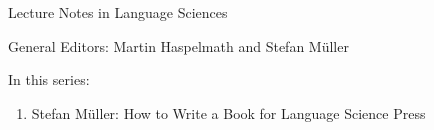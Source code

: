 
Lecture Notes in Language Sciences

General Editors: Martin Haspelmath and Stefan Müller

In this series:

\begin{enumerate}
\item Stefan Müller: How to Write a Book for Language Science Press
\end{enumerate}
